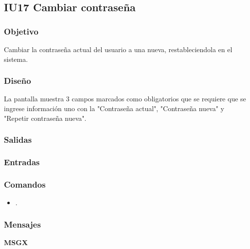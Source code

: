 \newpage
\subsection{IU17 Cambiar contraseña}

\subsubsection{Objetivo}
	Cambiar la contraseña actual del usuario a una nueva, restableciendola en el sistema.
	
\subsubsection{Diseño}
	La pantalla muestra 3 campos marcados como obligatorios que se requiere que se ingrese información uno con la "Contraseña actual", "Contraseña nueva" y "Repetir contraseña nueva".	


\subsubsection{Salidas}

\subsubsection{Entradas}

\subsubsection{Comandos}
\begin{itemize}
	\item {}.
\end{itemize}

\subsubsection{Mensajes}
\begin{Citemize}
	\item {\bf MSGX} 
\end{Citemize}
